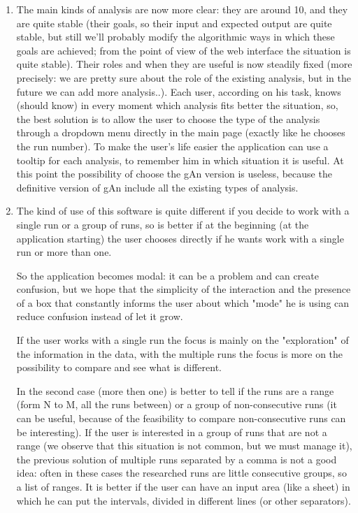 \begin{enumerate}
\item 
The main kinds of analysis are now more clear: they are around 10, and they are     quite stable (their goals, so their input and expected output are quite stable, but still we'll probably modify the algorithmic ways in which these goals are achieved; from the point of view of the web interface the situation is quite stable). Their roles and when they are useful is now steadily fixed (more precisely: we are pretty sure about the role of the existing analysis, but in the future we can add more analysis..). Each user, according on his task, knows (should know) in every moment which analysis fits better the situation, so, the best solution is to allow the user to choose the type of the analysis through a dropdown menu directly in the main page (exactly like he chooses the run number). To make the user's life easier the application can use a tooltip for each analysis, to remember him in which situation it is useful. At this point the possibility of choose the gAn version is useless, because the definitive version of gAn include all the existing types of analysis. 

\item 
The kind of use of this software is quite different if you decide to work with a single run or a group of runs, so is better if at the beginning (at the application starting) the user chooses directly if he wants work with a single run or more than one. 

So the application becomes modal: it can be a problem and can create confusion, but we hope that the simplicity of the interaction and the presence of a box that constantly informs the user about which "mode" he is using can reduce confusion instead of let it grow.  

If the user works with a single run the focus is mainly on the "exploration" of the information in the data, with the multiple runs the focus is more on the possibility to compare and see what is different.

In the second case (more then one) is better to tell if the runs are a range (form N to M, all the runs between) or a group of non-consecutive runs (it can be useful, because of the feasibility to compare non-consecutive runs can be interesting). If the user is interested in a group of runs that are not a range (we observe that this situation is not common, but we must manage it), the previous solution of multiple runs separated by a comma is not a good idea: often in these cases the researched runs are little consecutive groups, so a list of ranges. It is better if the user can have an input area (like a sheet) in which he can put the intervals, divided in different lines (or other separators).


\end{enumerate}
